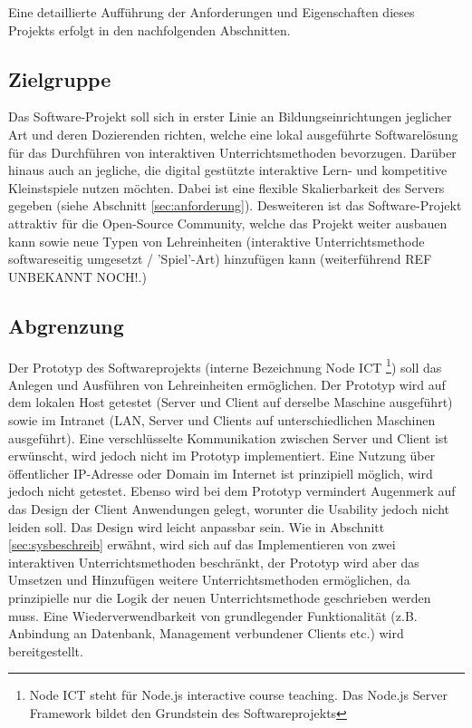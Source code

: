Eine detaillierte Aufführung der Anforderungen und Eigenschaften dieses Projekts erfolgt in den nachfolgenden Abschnitten. 

\subsection{Zielgruppe}\label{sec:zielgruppe}
Das Software-Projekt soll sich in erster Linie an Bildungseinrichtungen jeglicher Art und deren Dozierenden richten, welche eine lokal ausgeführte Softwarelösung für das Durchführen von interaktiven Unterrichtsmethoden bevorzugen. Darüber hinaus auch an jegliche, die digital gestützte interaktive Lern- und kompetitive Kleinstspiele nutzen möchten. Dabei ist eine flexible Skalierbarkeit des Servers gegeben (siehe Abschnitt \ref{sec:anforderung}). Desweiteren ist das Software-Projekt attraktiv für die Open-Source Community, welche das Projekt weiter ausbauen kann sowie neue Typen von Lehreinheiten (interaktive Unterrichtsmethode softwareseitig umgesetzt / 'Spiel'-Art) hinzufügen kann (weiterführend REF UNBEKANNT NOCH!.) 
\subsection{Abgrenzung}\label{sec:abgrenz}
Der Prototyp des Softwareprojekts (interne Bezeichnung Node ICT \footnote{Node ICT steht für Node.js interactive course teaching. Das Node.js Server Framework bildet den Grundstein des Softwareprojekts}) soll das Anlegen und Ausführen von Lehreinheiten ermöglichen. Der Prototyp wird auf dem lokalen Host getestet (Server und Client auf derselbe Maschine ausgeführt) sowie im Intranet (LAN, Server und Clients auf unterschiedlichen Maschinen ausgeführt). Eine verschlüsselte Kommunikation zwischen Server und Client ist erwünscht, wird jedoch nicht im Prototyp implementiert. Eine Nutzung über öffentlicher IP-Adresse oder Domain im Internet ist prinzipiell möglich, wird jedoch nicht getestet. Ebenso wird bei dem Prototyp vermindert Augenmerk auf das Design der Client Anwendungen gelegt, worunter die Usability jedoch nicht leiden soll. Das Design wird leicht anpassbar sein. Wie in Abschnitt \ref{sec:sysbeschreib} erwähnt, wird sich auf das Implementieren von zwei interaktiven Unterrichtsmethoden beschränkt, der Prototyp wird aber das Umsetzen und Hinzufügen weitere Unterrichtsmethoden ermöglichen, da prinzipielle nur die Logik der neuen Unterrichtsmethode geschrieben werden muss. Eine Wiederverwendbarkeit von grundlegender Funktionalität (z.B. Anbindung an Datenbank, Management verbundener Clients etc.) wird bereitgestellt.   
